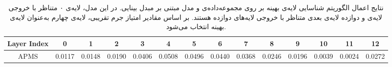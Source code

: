 \begin{landscape}
\begin{table}[H]
    \centering
    \caption[نتیجه‌ی اعمال الگوریتم شناسایی لایه‌ی بهینه در مجموعه داده‌ی .]{نتایج اعمال الگوریتم شناسایی لایه‌ی بهینه بر روی مجموعه‌داده‌ی  و مدل مبتنی بر مبدل بینایی. در این مدل، لایه‌ی ۰ متناظر با خروجی لایه‌ی  و دوازده لایه‌ی بعدی متناظر با خروجی‌ لایه‌های دوازده  هستند. بر اساس مقادیر امتیاز جرم تقریبی، لایه‌ی چهارم به‌عنوان لایه‌ی بهینه انتخاب می‌شود.}    
    \label{table:alg2_results}
    \begin{latin}
    \begin{tabular}{c c c c c c c c c c c c c c}
    \toprule
    Layer Index & 0 & 1 & 2 & 3 & 4 & 5 & 6 & 7 & 8 & 9 & 10 & 11 & 12 \\
    \midrule
    APMS        & 0.0117 & 0.0148 & 0.0190 & 0.0406 & 0.0508 & 0.0496 & 0.0440 & 0.0368 & 0.0246 & 0.0196 & 0.0039 & 0.0024 & 0.0272 \\
    \bottomrule
    \end{tabular}
    \end{latin}
\end{table}


\end{landscape}
